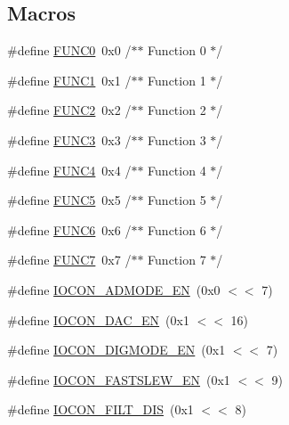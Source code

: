 \subsection*{Macros}
\begin{DoxyCompactItemize}
\item 
\#define \hyperlink{group__IOCON__17XX__40XX_gaa3ba064ba85ae0da9c55e7cdb8ea09b3}{F\+U\+N\+C0}~0x0				/$\ast$$\ast$ Function 0  $\ast$/
\item 
\#define \hyperlink{group__IOCON__17XX__40XX_ga3f9b8eb1b4789fef1da73f4eb041ddfc}{F\+U\+N\+C1}~0x1				/$\ast$$\ast$ Function 1  $\ast$/
\item 
\#define \hyperlink{group__IOCON__17XX__40XX_ga0e8023a25dd46655b8eda5b0476ba169}{F\+U\+N\+C2}~0x2				/$\ast$$\ast$ Function 2	$\ast$/
\item 
\#define \hyperlink{group__IOCON__17XX__40XX_gadeea02cdf0e8b64c27b6fad4d2b3b2b5}{F\+U\+N\+C3}~0x3				/$\ast$$\ast$ Function 3	$\ast$/
\item 
\#define \hyperlink{group__IOCON__17XX__40XX_ga769e96bef0ce818be7aa2cb0a0a67753}{F\+U\+N\+C4}~0x4				/$\ast$$\ast$ Function 4  $\ast$/
\item 
\#define \hyperlink{group__IOCON__17XX__40XX_gaa8d0feff604f4d347ce09d433de1b32d}{F\+U\+N\+C5}~0x5				/$\ast$$\ast$ Function 5  $\ast$/
\item 
\#define \hyperlink{group__IOCON__17XX__40XX_ga3070395c343da6e051c4ebbcd3185a87}{F\+U\+N\+C6}~0x6				/$\ast$$\ast$ Function 6	$\ast$/
\item 
\#define \hyperlink{group__IOCON__17XX__40XX_ga25318daff6c777173bc54d6eeac7cb83}{F\+U\+N\+C7}~0x7				/$\ast$$\ast$ Function 7	$\ast$/
\item 
\#define \hyperlink{group__IOCON__17XX__40XX_ga9a3d4f3e281c382f795b9a769073d4e4}{I\+O\+C\+O\+N\+\_\+\+A\+D\+M\+O\+D\+E\+\_\+\+EN}~(0x0 $<$$<$ 7)
\item 
\#define \hyperlink{group__IOCON__17XX__40XX_gabb788549592ca772def19f2a8060aa3d}{I\+O\+C\+O\+N\+\_\+\+D\+A\+C\+\_\+\+EN}~(0x1 $<$$<$ 16)
\item 
\#define \hyperlink{group__IOCON__17XX__40XX_ga516e9d9bc7b1f3aaefd9d09c6ece74d2}{I\+O\+C\+O\+N\+\_\+\+D\+I\+G\+M\+O\+D\+E\+\_\+\+EN}~(0x1 $<$$<$ 7)
\item 
\#define \hyperlink{group__IOCON__17XX__40XX_ga478aa0f55e07c89035e36378b2c3780b}{I\+O\+C\+O\+N\+\_\+\+F\+A\+S\+T\+S\+L\+E\+W\+\_\+\+EN}~(0x1 $<$$<$ 9)
\item 
\#define \hyperlink{group__IOCON__17XX__40XX_gabebfb8b8646d151bfee9615c75724119}{I\+O\+C\+O\+N\+\_\+\+F\+I\+L\+T\+\_\+\+D\+IS}~(0x1 $<$$<$ 8)
$$
\end{DoxyCompactItemize}
